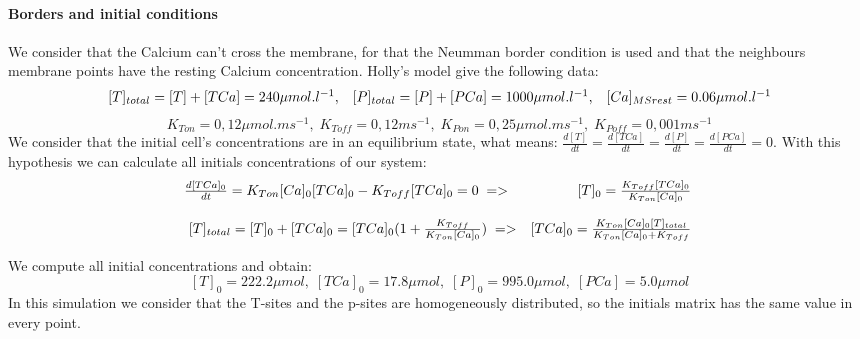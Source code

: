 \documentclass[a4paper,11pt]{report}
\begin{document}
\paragraph{Borders and initial conditions}
We consider that the Calcium can't cross the membrane, for that the Neumman border condition is used and that the neighbours membrane points have the resting Calcium concentration. \cite{Jiang1999} 
Holly's model \cite{Holly1989} give the following data:\\
$$\begin{array}{l c r}
\ [T]_{total}=[T]+[TCa]= 240 \mu mol. l^{-1}, & [P]_{total}=[P]+[PCa]=1000 \mu mol. l^{-1}, & [Ca]_{MSrest}= 0.06 \mu mol. l^{-1} \\
\end{array} \\
$$
$$
\ K_{Ton}=0,12\mu mol. ms^{-1}, \; K_{Toff}=0,12ms^{-1}, \; K_{Pon}=0,25 \mu mol. ms^{-1}, \;  K_{Poff}=0,001 ms^{-1} 
$$
We consider that the initial cell's concentrations are in an equilibrium state, what means: $\frac{d [T]}{dt}=\frac{d [TCa]}{dt}=\frac{d [P]}{dt}=\frac{d [PCa]}{dt}=0$. With this hypothesis we can calculate all initials concentrations of our system:
$$
\begin{array}{l r} 
\frac{d [TCa]_{0}}{dt}=K_{Ton}[Ca]_{0}[TCa]_{0}-K_{Toff}[TCa]_{0}=0 \; => & [T]_{0}=\frac{K_{Toff}[TCa]_{0}}{K_{Ton}[Ca]_{0}} \\ 
\\
\ [T]_{total}= [T]_{0}+ [TCa]_{0}= [TCa]_{0}(1+ \frac{K_{Toff}}{K_{Ton} [Ca]_{0}}) \; => & [TCa]_{0}= \frac{K_{Ton} [Ca]_{0} [T]_{total}}{K_{Ton} [Ca]_{0}+K_{Toff}} \\
\end{array} 
$$

We compute all initial concentrations and obtain:
$$
\ [T]_{0}=222.2 \mu mol, \; [TCa]_{0}=17.8 \mu mol, \; [P]_{0}=995.0 \mu mol, \; [PCa]=5.0 \mu mol
$$
In this simulation we consider that the T-sites and the p-sites are homogeneously distributed, so the initials matrix has the same value in every point.  
\end{document}
